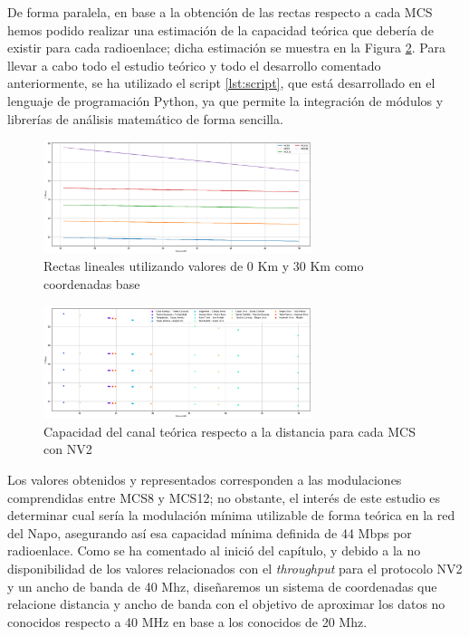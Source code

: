 	De forma paralela, en base a la obtención de las rectas respecto a cada MCS hemos podido realizar una estimación de la capacidad teórica que debería de existir para cada radioenlace; dicha estimación se muestra en la Figura \ref{valoresmbps}. Para llevar a cabo todo el estudio teórico y todo el desarrollo comentado anteriormente, se ha utilizado el script \ref{lst:script}, que está desarrollado en el lenguaje de programación Python, ya que permite la integración de módulos y librerías de análisis matemático de forma sencilla.
	
	\begin{figure}[H]
		\centering
		\includegraphics[width=0.7\textwidth]{img/rectas.png}
		\caption{Rectas lineales utilizando valores de 0 Km y 30 Km como coordenadas base}
		\label{rectaspendiente}
	\end{figure}
	
	\begin{figure}[H]
		\centering
		\includegraphics[width=0.7\textwidth]{img/valoresmbps.png}
		\caption{Capacidad del canal teórica respecto a la distancia para cada MCS con NV2}
		\label{valoresmbps}
	\end{figure}
	
	Los valores obtenidos y representados corresponden a las modulaciones comprendidas entre MCS8 y MCS12; no obstante, el interés de este estudio es determinar cual sería la modulación mínima utilizable de forma teórica en la red del Napo, asegurando así esa capacidad mínima definida de 44 Mbps por radioenlace. Como se ha comentado al inició del capítulo, y debido a la no disponibilidad de los valores relacionados con el \textit{throughput} para el protocolo NV2 y un ancho de banda de 40 Mhz, diseñaremos un sistema de coordenadas que relacione distancia y ancho de banda con el objetivo de aproximar los datos no conocidos respecto a 40 MHz en base a los conocidos de 20 Mhz.\\
	
